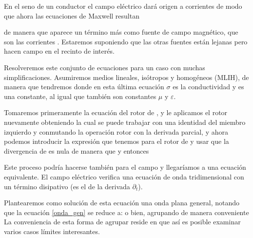 \documentclass[10pt,oneside]{CBFT_article}
\begin{document}
En el seno de un conductor el campo eléctrico dará origen a corrientes de
modo que ahora las ecuaciones de Maxwell resultan 

de manera que aparece un término más como fuente de campo magnético, que 
son las corrientes . Estaremos suponiendo que las otras fuentes están 
lejanas pero hacen campo en el recinto de interés.

Resolveremos este conjunto de ecuaciones para un caso con muchas simplificaciones.
Asumiremos medios lineales, isótropos y homogéneos (MLIH), de manera que tendremos
donde en esta última ecuación $\sigma$ es la conductividad y es una constante, 
al igual que también son constantes $\mu$ y $\varepsilon$.

Tomaremos primeramente la ecuación del rotor de , y le aplicamos el rotor 
nuevamente obteniendo
la cual se puede trabajar con una identidad del miembro izquierdo y 
conmutando la operación rotor con la derivada parcial,
y ahora podemos introducir la expresión que tenemos para el rotor de  y 
usar que la divergencia de  es nula de manera que
y entonces

Este proceso podría hacerse también para el campo  y llegaríamos a una 
ecuación equivalente. El campo eléctrico verifica una ecuación de onda 
tridimensional con un término disipativo (es el de la derivada $\partial_t$).

Plantearemos como solución de esta ecuación una onda plana general,
notando que 
la ecuación \eqref{onda_gen} se reduce a:
o bien, agrupando de manera conveniente
La conveniencia de esta forma de agrupar reside en que así es posible examinar 
varios casos límites interesantes.
\end{document}
